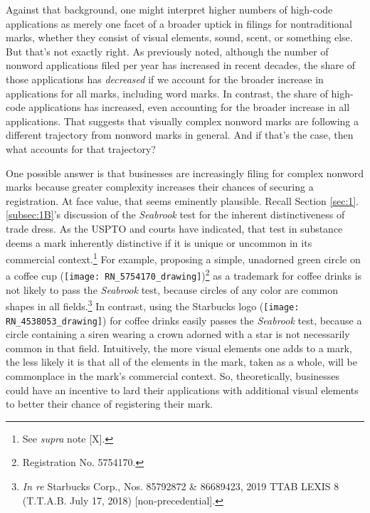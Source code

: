 \documentclass[letterpaper, 11pt, oneside]{article}
\begin{document}
Against that background, one might interpret higher numbers of high-code applications as merely one facet of a broader uptick in filings for nontraditional marks, whether they consist of visual elements, sound, scent, or something else. But that's not exactly right. As previously noted, although the number of nonword applications filed per year has increased in recent decades, the share of those applications has \emph{decreased} if we account for the broader increase in applications for all marks, including word marks. In contrast, the share of high-code applications has increased, even accounting for the broader increase in all applications. That suggests that visually complex nonword marks are following a different trajectory from nonword marks in general. And if that's the case, then what accounts for that trajectory?

One possible answer is that businesses are increasingly filing for complex nonword marks because greater complexity increases their chances of securing a registration. At face value, that seems eminently plausible. Recall Section \ref{sec:1}.\ref{subsec:1B}'s discussion of the \textit{Seabrook} test for the inherent distinctiveness of trade dress. As the USPTO and courts have indicated, that test in substance deems a mark inherently distinctive if it is unique or uncommon in its commercial context.\footnote{See \textit{supra} note [X].} For example, proposing a simple, unadorned green circle on a coffee cup (\texttt{[image: RN\_5754170\_drawing]})\footnote{Registration No. 5754170.} as a trademark for coffee drinks is not likely to pass the \textit{Seabrook} test, because circles of any color are common shapes in all fields.\footnote{\textit{In re} Starbucks Corp., Nos. 85792872 \& 86689423, 2019 TTAB LEXIS 8 (T.T.A.B. July 17, 2018) [non-precedential].} In contrast, using the Starbucks logo (\texttt{[image: RN\_4538053\_drawing]}) for coffee drinks easily passes the \textit{Seabrook} test, because a circle containing a siren wearing a crown adorned with a star is not necessarily common in that field. Intuitively, the more visual elements one adds to a mark, the less likely it is that all of the elements in the mark, taken as a whole, will be commonplace in the mark's commercial context. So, theoretically, businesses could have an incentive to lard their applications with additional visual elements to better their chance of registering their mark.
\end{document}
